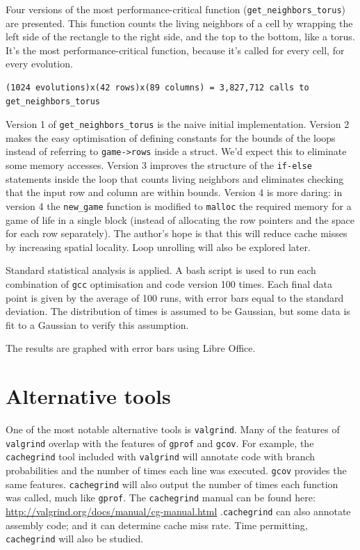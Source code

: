 \documentclass{article}
\begin{document}
Four versions of the most performance-critical function (\verb=get_neighbors_torus=) are presented. This function counts the living neighbors of a cell by wrapping the left side of the rectangle to the right side, and the top to the bottom, like a torus. It's the most performance-critical function, because it's called for every cell, for every evolution.

\begin{verbatim}
(1024 evolutions)x(42 rows)x(89 columns) = 3,827,712 calls to get_neighbors_torus
\end{verbatim}

 Version 1 of \verb=get_neighbors_torus= is the naive initial implementation. Version 2 makes the easy optimisation of defining constants for the bounds of the loops instead of referring to \verb=game->rows= inside a struct. We'd expect this to eliminate some memory accesses. Version 3 improves the structure of the \verb=if-else= statements inside the loop that counts living neighbors and eliminates checking that the input row and column are within bounds. Version 4 is more daring: in version 4 the \verb=new_game= function is modified to \verb=malloc= the required memory for a game of life in a single block (instead of allocating the row pointers and the space for each row separately). The author's hope is that this will reduce cache misses by increasing spatial locality. Loop unrolling will also be explored later.  

Standard statistical analysis is applied. A bash script is used to run each combination of \verb=gcc= optimisation and code version 100 times. Each final data point is given by the average of 100 runs, with error bars equal to the standard deviation. The distribution of times is assumed to be Gaussian, but some data is fit to a Gaussian to verify this assumption. 

The results are graphed with error bars using Libre Office. 

\section{Alternative tools}
One of the most notable alternative tools is \verb=valgrind=. Many of the features of \verb=valgrind= overlap with the features of \verb=gprof= and \verb=gcov=. For example, the \verb=cachegrind= tool included with \verb=valgrind= will annotate code with branch probabilities and the number of times each line was executed. \verb=gcov= provides the same features. \verb=cachegrind= will also output the number of times each function was called, much like \verb=gprof=. The \verb=cachegrind= manual can be found here: \url{http://valgrind.org/docs/manual/cg-manual.html} .\verb=cachegrind= can also annotate assembly code; and it can determine cache miss rate. Time permitting, \verb=cachegrind= will also be studied.  
\end{document}
